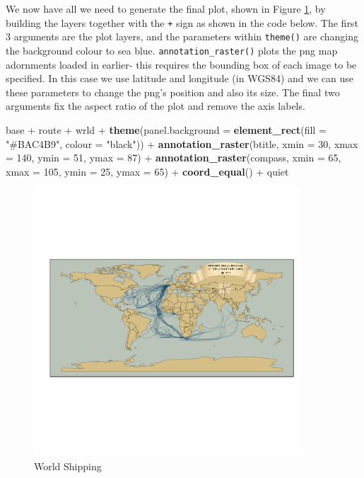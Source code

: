 \documentclass[]{article}
\newenvironment{Shaded}{}{}
\newcommand{\KeywordTok}[1]{\textcolor[rgb]{0.00,0.44,0.13}{\textbf{{#1}}}}
\newcommand{\DataTypeTok}[1]{\textcolor[rgb]{0.56,0.13,0.00}{{#1}}}
\newcommand{\DecValTok}[1]{\textcolor[rgb]{0.25,0.63,0.44}{{#1}}}
\newcommand{\StringTok}[1]{\textcolor[rgb]{0.25,0.44,0.63}{{#1}}}
\newcommand{\NormalTok}[1]{{#1}}
\let\Oldincludegraphics\includegraphics
\renewcommand{\includegraphics}[1]{\Oldincludegraphics[width=10cm]{#1}}
\begin{document}
We now have all we need to generate the final plot, shown in Figure \ref{fship}, by building the
layers together with the \texttt{+} sign as shown in the code below. The
first 3 arguments are the plot layers, and the parameters within
\texttt{theme()} are changing the background colour to sea blue.
\texttt{annotation\_raster()} plots the png map adornments loaded in
earlier- this requires the bounding box of each image to be specified.
In this case we use latitude and longitude (in WGS84) and we can use
these parameters to change the png's position and also its size. The
final two arguments fix the aspect ratio of the plot and remove the axis
labels.

\begin{Shaded}
\begin{Highlighting}[]
\NormalTok{base + route + wrld + }\KeywordTok{theme}\NormalTok{(}\DataTypeTok{panel.background =} \KeywordTok{element_rect}\NormalTok{(}\DataTypeTok{fill =} \StringTok{"#BAC4B9"}\NormalTok{, }
    \DataTypeTok{colour =} \StringTok{"black"}\NormalTok{)) + }\KeywordTok{annotation_raster}\NormalTok{(btitle, }\DataTypeTok{xmin =} \DecValTok{30}\NormalTok{, }\DataTypeTok{xmax =} \DecValTok{140}\NormalTok{, }\DataTypeTok{ymin =} \DecValTok{51}\NormalTok{, }
    \DataTypeTok{ymax =} \DecValTok{87}\NormalTok{) + }\KeywordTok{annotation_raster}\NormalTok{(compass, }\DataTypeTok{xmin =} \DecValTok{65}\NormalTok{, }\DataTypeTok{xmax =} \DecValTok{105}\NormalTok{, }\DataTypeTok{ymin =} \DecValTok{25}\NormalTok{, }
    \DataTypeTok{ymax =} \DecValTok{65}\NormalTok{) + }\KeywordTok{coord_equal}\NormalTok{() + quiet}
\end{Highlighting}
\end{Shaded}
\begin{figure}[htbp]
\centering 
\includegraphics{figure/World_Shipping.png}
\caption{World Shipping} \label{fship}
\end{figure}
\end{document}
